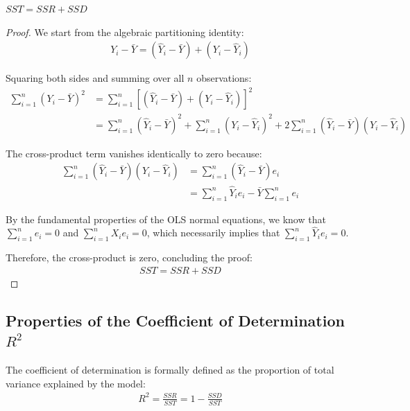 \begin{teorema}
	$SST = SSR + SSD$
\end{teorema}

\begin{proof}
	We start from the algebraic partitioning identity:
	\begin{align}
		Y_i - \bar{Y} = (\hat{Y}_i - \bar{Y}) + (Y_i - \hat{Y}_i)
	\end{align}
	
	Squaring both sides and summing over all $n$ observations:
	\begin{align}
		\sum_{i=1}^{n} (Y_i - \bar{Y})^2 &= \sum_{i=1}^{n} \left[ (\hat{Y}_i - \bar{Y}) + (Y_i - \hat{Y}_i) \right]^2 \\
		&= \sum_{i=1}^{n} (\hat{Y}_i - \bar{Y})^2 + \sum_{i=1}^{n} (Y_i - \hat{Y}_i)^2 + 2\sum_{i=1}^{n} (\hat{Y}_i - \bar{Y})(Y_i - \hat{Y}_i)
	\end{align}
	
	The cross-product term vanishes identically to zero because:
	\begin{align}
		\sum_{i=1}^{n} (\hat{Y}_i - \bar{Y})(Y_i - \hat{Y}_i) &= \sum_{i=1}^{n} (\hat{Y}_i - \bar{Y})e_i \\
		&= \sum_{i=1}^{n} \hat{Y}_i e_i - \bar{Y} \sum_{i=1}^{n} e_i
	\end{align}
	
	By the fundamental properties of the OLS normal equations, we know that $\sum_{i=1}^{n} e_i = 0$ and $\sum_{i=1}^{n} X_i e_i = 0$, which necessarily implies that $\sum_{i=1}^{n} \hat{Y}_i e_i = 0$.
	
	Therefore, the cross-product is zero, concluding the proof:
	\begin{align}
		SST = SSR + SSD
	\end{align}
\end{proof}

\subsection{Properties of the Coefficient of Determination $R^2$}

The coefficient of determination is formally defined as the proportion of total variance explained by the model:
\begin{align}
	R^2 = \frac{SSR}{SST} = 1 - \frac{SSD}{SST}
\end{align}

